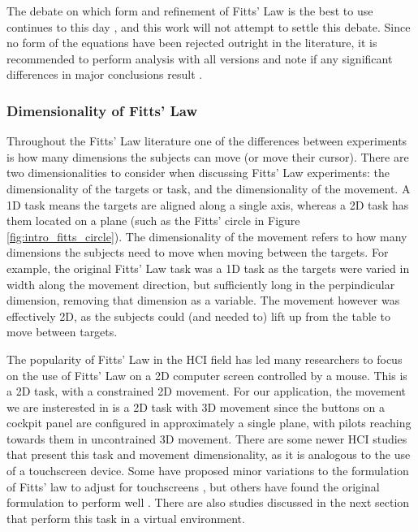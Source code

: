 The debate on which form and refinement of Fitts' Law is the best to use continues to this day \citep{drewes_only_2010,hoffmann_which_2013}, and this work will not attempt to settle this debate.
Since no form of the equations have been rejected outright in the literature, it is recommended to perform analysis with all versions and note if any significant differences in major conclusions result \citep{soukoreff_towards_2004}.

\subsubsection{Dimensionality of Fitts' Law}\label{dimensionality-of-fitts-law}

Throughout the Fitts' Law literature one of the differences between experiments is how many dimensions the subjects can move (or move their cursor).
There are two dimensionalities to consider when discussing Fitts' Law experiments: the dimensionality of the targets or task, and the dimensionality of the movement.
A 1D task means the targets are aligned along a single axis, whereas a 2D task has them located on a plane (such as the Fitts' circle in Figure \ref{fig:intro_fitts_circle}).
The dimensionality of the movement refers to how many dimensions the subjects need to move when moving between the targets.
For example, the original Fitts' Law task was a 1D task as the targets were varied in width along the movement direction, but sufficiently long in the perpindicular dimension, removing that dimension as a variable.
The movement however was effectively 2D, as the subjects could (and needed to) lift up from the table to move between targets.

The popularity of Fitts' Law in the HCI field has led many researchers to focus on the use of Fitts' Law on a 2D computer screen controlled by a mouse.
This is a 2D task, with a constrained 2D movement.
For our application, the movement we are insterested in is a 2D task with 3D movement since the buttons on a cockpit panel are configured in approximately a single plane, with pilots reaching towards them in uncontrained 3D movement.
There are some newer HCI studies that present this task and movement dimensionality, as it is analogous to the use of a touchscreen device.
Some have proposed minor variations to the formulation of Fitts' law to adjust for touchscreens \citep{bi_ffitts_2013,sears_high_1991}, but others have found the original formulation to perform well \citep{mackenzie_fitts_2015}.
There are also studies discussed in the next section that perform this task in a virtual environment.

